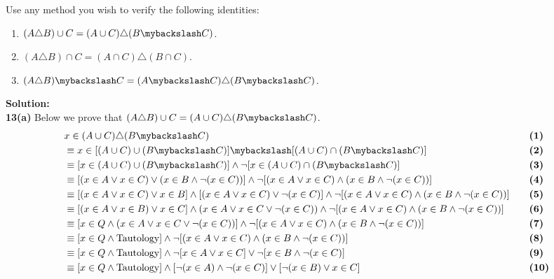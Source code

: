 Use any method you wish to verify the following identities:

\begin{enumerate}[label=(\alph*)]
\item $(A \triangle B) \cup C = (A \cup C) \triangle (B \mybackslash C)$.
\item $(A \triangle B) \cap C = (A \cap C) \triangle (B \cap C)$.
\item $(A \triangle B) \mybackslash C = (A \mybackslash C) \triangle (B \mybackslash C)$.
\end{enumerate}

\textbf{Solution:} \\
\textbf{13(a)} Below we prove that $(A \triangle B) \cup C = (A \cup C) \triangle (B \mybackslash C)$.
\begin{alignat*}{2}
&x \in (A \cup C) \triangle (B \mybackslash C) && \quad \textbf{(1)} \\
&\equiv x \in [(A \cup C) \cup (B \mybackslash C)] \mybackslash [(A \cup C) \cap (B \mybackslash C)] && \quad \textbf{(2)}\\
&\equiv [x \in (A \cup C) \cup (B \mybackslash C)] \wedge \neg [x \in (A \cup C) \cap (B \mybackslash C)] && \quad \textbf{(3)}\\
&\equiv {[(x \in A \vee x \in C) \vee (x \in B \wedge \neg (x \in C))]} \wedge \neg [(x \in A \vee x \in C) \wedge (x \in B \wedge \neg (x \in C))] && \quad \textbf{(4)}\\
&\equiv {[(x \in A \vee x \in C) \vee x \in B] \wedge [(x \in A \vee x \in C) \vee \neg (x \in C)]} \wedge \neg [(x \in A \vee x \in C) \wedge (x \in B \wedge \neg (x \in C))] && \quad \textbf{(5)}\\
&\equiv {[(x \in A \vee x \in B) \vee x \in C] \wedge (x \in A \vee x \in C \vee \neg (x \in C))} \wedge \neg [(x \in A \vee x \in C) \wedge (x \in B \wedge \neg (x \in C))] && \quad \textbf{(6)}\\
&\equiv [x \in Q \wedge (x \in A \vee x \in C \vee \neg (x \in C))] \wedge \neg [(x \in A \vee x \in C) \wedge (x \in B \wedge \neg (x \in C))] && \quad \textbf{(7)}\\
&\equiv [x \in Q \wedge \text{Tautology}] \wedge \neg [(x \in A \vee x \in C) \wedge (x \in B \wedge \neg (x \in C))] && \quad \textbf{(8)}\\
&\equiv [x \in Q \wedge \text{Tautology}] \wedge {\neg [x \in A \vee x \in C] \vee \neg [x \in B \wedge \neg (x \in C)]} && \quad \textbf{(9)}\\
&\equiv [x \in Q \wedge \text{Tautology}] \wedge {[\neg (x \in A) \wedge \neg (x \in C)] \vee [\neg (x \in B) \vee x \in C]} && \quad \textbf{(10)}\\

\end{alignat*}
